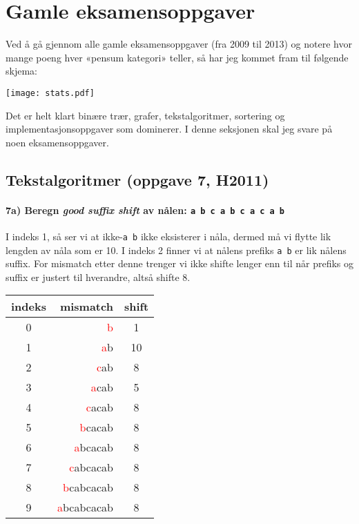 \documentclass[11pt,a4paper]{article}
\theoremstyle{def}
\begin{document}
\newpage

\section{Gamle eksamensoppgaver}
Ved å gå gjennom alle gamle eksamensoppgaver (fra 2009 til 2013) og notere hvor mange poeng hver «pensum kategori» teller, så har jeg kommet fram til følgende skjema:

\texttt{[image: stats.pdf]}

Det er helt klart binære trær, grafer, tekstalgoritmer, sortering og implementasjonsoppgaver som dominerer. I denne seksjonen skal jeg svare på noen eksamensoppgaver.

\subsection{Tekstalgoritmer (oppgave 7, H2011)}
\paragraph{7a) Beregn \textit{good suffix shift} av nålen: \texttt{a b c a b c a c a b}}
I indeks 1, så ser vi at ikke-\texttt{a b} ikke eksisterer i nåla, dermed må vi flytte lik lengden av nåla som er 10. I indeks 2 finner vi at nålens prefiks \texttt{a b} er lik nålens suffix. For mismatch etter denne trenger vi ikke shifte lenger enn til når prefiks og suffix er justert til hverandre, altså shifte 8.
\begin{center}
\begin{tabular}{crc}
indeks & mismatch & shift\\
\hline
0&\textcolor{red}{b}&1\\
1&\textcolor{red}{a}b&10\\
2&\textcolor{red}{c}ab&8\\
3&\textcolor{red}{a}cab&5\\
4&\textcolor{red}{c}acab&8\\
5&\textcolor{red}{b}cacab&8\\
6&\textcolor{red}{a}bcacab&8\\
7&\textcolor{red}{c}abcacab&8\\
8&\textcolor{red}{b}cabcacab&8\\
9&\textcolor{red}{a}bcabcacab&8\\
\end{tabular}
\end{center}

\newpage
\end{document}
